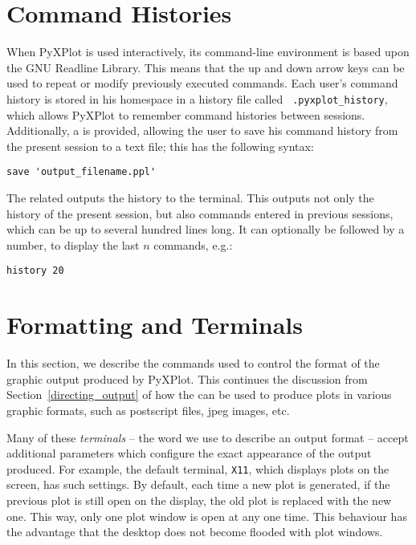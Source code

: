 \section{Command Histories}

When PyXPlot is used interactively, its command-line environment is based upon
the GNU Readline Library.  This means that the up and down arrow keys can be
used to repeat or modify previously executed commands. Each user's command
history is stored in his homespace in a history file called {\tt
.pyxplot\_history}, which allows PyXPlot to remember command histories between
sessions. Additionally, a  is provided, allowing the user to save
his command history from the present session to a text file; this has the
following syntax:

\begin{verbatim}
save 'output_filename.ppl'
\end{verbatim}

The related  outputs the history to the terminal. This outputs
not only the history of the present session, but also commands entered in
previous sessions, which can be up to several hundred lines long. It can
optionally be followed by a number, to display the last $n$ commands, e.g.:

\begin{verbatim}
history 20
\end{verbatim}

\section{Formatting and Terminals}
\label{set_terminal2}

In this section, we describe the commands used to control the format of the
graphic output produced by PyXPlot. This continues the discussion from
Section~\ref{directing_output} of how the  can be used to
produce plots in various graphic formats, such as postscript files, jpeg
images, etc.

Many of these {\it terminals} -- the word we use to describe an output format
-- accept additional parameters which configure the exact appearance of the
output produced.  For example, the default terminal, {\tt X11}, which displays
plots on the screen, has such settings. By default, each time a new plot is
generated, if the previous plot is still open on the display, the old plot is
replaced with the new one. This way, only one plot window is open at any one
time.  This behaviour has the advantage that the desktop does not become
flooded with plot windows.

